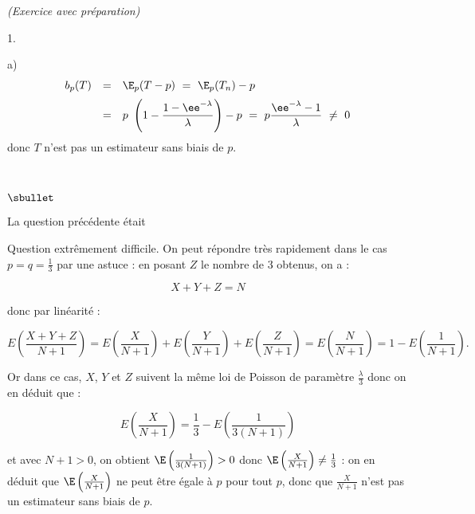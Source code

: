 \documentclass[11pt]{article}%
\begin{document}
\begin{exercice}{\it (Exercice avec préparation)}
\begin{noliste}{1.}
\begin{noliste}{a)}
\[
\begin{array}{rcl}
 b_{p}(T) & = & \E_{p}(T - p) \ = \ \E_{p}(T_{n}) - p \\[.2cm]
 & = & p \ \left(1 - \dfrac{1 - \ee^{- \lambda}}{\lambda}
 \right) - p \ = \ p \dfrac{\ee^{- \lambda} - 1}{\lambda} 
 \ \neq \ 0
\end{array}
\]
 donc $T$ n'est pas un estimateur sans biais de $p$.
 \end{noliste}
 \begin{remark}~
 \begin{noliste}{$\sbullet$}
 \item La question précédente était 
 
 \item 
 Question extrêmement difficile. On peut répondre très
 rapidement dans le cas $p = q = \frac{1}{3}$ par une astuce : en
 posant $Z$ le nombre de 3 obtenus, on a :
 
\[
 X + Y + Z = N
\]
 
 donc par linéarité :
 
\[
 E \left( \frac{ X + Y + Z }{ N + 1 } \right) = E \left(
 \frac{ X }{ N + 1 } \right) + E \left( \frac{ Y }{ N + 1 }
 \right) + E \left( \frac{ Z }{ N + 1 } \right) = E \left(
 \frac{ N }{ N + 1 } \right) = 1 - E \left( \frac{ 1 }{ N + 
 1 } \right).
\]
 
 Or dans ce cas, $X$, $Y$ et $Z$ suivent la même loi de
 Poisson de paramètre $\frac{ \lambda }{ 3 }$ donc on en
 déduit que :
 
\[
 E \left( \frac{ X }{ N + 1 } \right) = \frac{ 1 }{ 3 } - E
 \left( \frac{ 1 }{ 3 ( N + 1 ) } \right)
\]
 
 et avec $N + 1 > 0$, on obtient $\E\left( \frac{ 1 }{ 3 (N + 1)
 } \right) > 0 $ donc $\E\left( \frac{ X }{ N + 1 } \right)
 \neq \frac{ 1 }{ 3 }$ : on en déduit que $\E\left( \frac{ X
 }{ N + 1 } \right) $ ne peut être égale à $p$ pour tout $p$,
 donc que $\frac{ X }{ N + 1 }$ n'est pas un estimateur sans
 biais de $p$.
 \end{noliste}
 \end{remark}
 \end{noliste}
 \end{exercice}
 

\newpage
\end{document}
